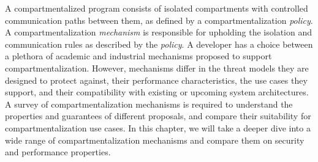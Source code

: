A compartmentalized program consists of isolated compartments with controlled
communication paths between them, as defined by a 
compartmentalization \emph{policy}.
A compartmentalization \emph{mechanism} is responsible for upholding the
isolation and communication rules as described by the \emph{policy}.
A developer has a choice between a plethora of academic and industrial 
mechanisms proposed to support compartmentalization.
However, mechanisms differ in the threat models they are designed to protect
against, their performance characteristics, the use cases they support, and
their compatibility with existing or upcoming system architectures.
A survey of compartmentalization mechanisms is required to understand the
properties and guarantees of different proposals, and compare their
suitability for compartmentalization use cases.
In this chapter, we will take a deeper dive into a wide range of 
compartmentalization mechanisms and compare them on security and performance
properties.





